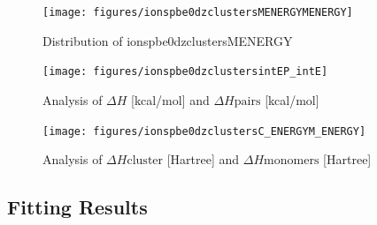 \documentclass[journal=jacsat,manuscript=article]{achemso}
\begin{document}
\begin{figure}
    \centering
    \texttt{[image: figures/ionspbe0dzclustersMENERGYMENERGY]}
    \caption{ Distribution of ionspbe0dzclustersMENERGY }
    \label{fig:ionspbe0dzclusterssinglekey}
\end{figure}

\begin{figure}
    \centering
    \texttt{[image: figures/ionspbe0dzclustersintEP\_intE]}
    \caption{ Analysis of $\Delta H$ [kcal/mol] and $\Delta H{\mathrm{pairs}}$ [kcal/mol] }
    \label{fig:ionspbe0dzclusters_intE_P_intE}
\end{figure}

\begin{figure}
    \centering
    \texttt{[image: figures/ionspbe0dzclustersC\_ENERGYM\_ENERGY]}
    \caption{ Analysis of $\Delta H{\mathrm{cluster}}$ [Hartree] and $\Delta H{\mathrm{monomers}}$ [Hartree] }
    \label{fig:ionspbe0dzclusters_C_ENERGY_M_ENERGY}
\end{figure}
\newpage 
 \subsection{Fitting Results}
\end{document}
